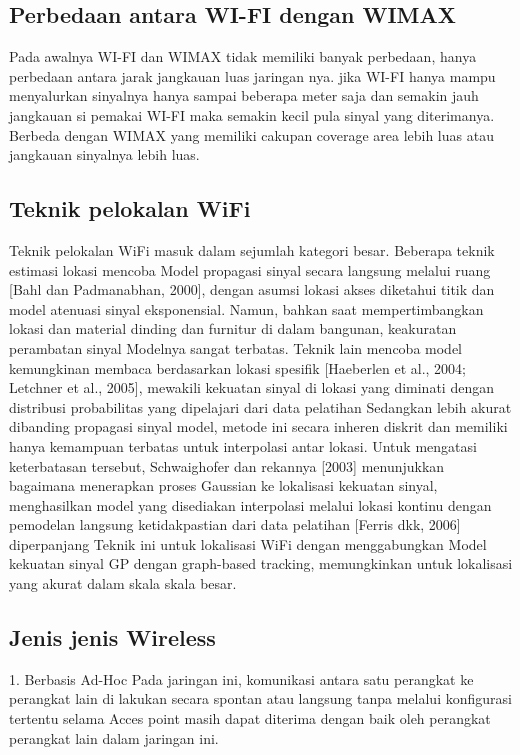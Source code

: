 \subsection {Perbedaan antara WI-FI dengan WIMAX}

Pada awalnya WI-FI dan WIMAX tidak memiliki banyak perbedaan, hanya perbedaan antara jarak jangkauan luas jaringan nya.
jika WI-FI hanya mampu menyalurkan sinyalnya hanya sampai beberapa meter saja dan semakin jauh jangkauan si pemakai WI-FI maka
semakin kecil pula sinyal yang diterimanya. Berbeda dengan WIMAX yang memiliki cakupan coverage area lebih luas atau jangkauan 
sinyalnya lebih luas.

\subsection{Teknik pelokalan WiFi}

Teknik pelokalan WiFi masuk dalam sejumlah kategori besar. Beberapa teknik estimasi lokasi mencoba Model propagasi sinyal secara 
langsung melalui ruang [Bahl dan Padmanabhan, 2000], dengan asumsi lokasi akses diketahui titik dan model atenuasi sinyal eksponensial. 
Namun, bahkan saat mempertimbangkan lokasi dan material dinding dan furnitur di dalam bangunan, keakuratan perambatan sinyal Modelnya 
sangat terbatas. Teknik lain mencoba model kemungkinan membaca berdasarkan lokasi spesifik [Haeberlen et al., 2004; Letchner et al., 
2005], mewakili kekuatan sinyal di lokasi yang diminati dengan distribusi probabilitas yang dipelajari dari data pelatihan Sedangkan 
lebih akurat dibanding propagasi sinyal model, metode ini secara inheren diskrit dan memiliki hanya kemampuan terbatas untuk interpolasi 
antar lokasi. Untuk mengatasi keterbatasan tersebut, Schwaighofer dan rekannya [2003] menunjukkan bagaimana menerapkan proses Gaussian 
ke lokalisasi kekuatan sinyal, menghasilkan model yang disediakan interpolasi melalui lokasi kontinu dengan pemodelan langsung
ketidakpastian dari data pelatihan [Ferris dkk, 2006] diperpanjang Teknik ini untuk lokalisasi WiFi dengan menggabungkan Model kekuatan 
sinyal GP dengan graph-based tracking, memungkinkan untuk lokalisasi yang akurat dalam skala skala besar.

\subsection{Jenis jenis Wireless}
1. Berbasis Ad-Hoc
Pada jaringan ini, komunikasi antara satu perangkat ke perangkat lain di lakukan secara
spontan atau langsung tanpa melalui konfigurasi tertentu selama Acces point masih dapat
diterima dengan baik oleh perangkat perangkat lain dalam jaringan ini.

